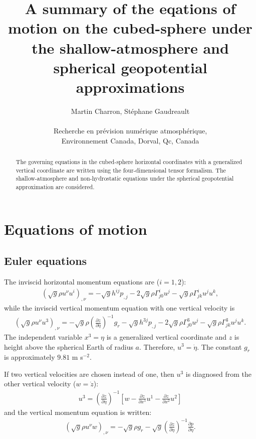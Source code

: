 \documentclass{article}
\begin{document}
\title{A summary of the eqations of motion on the cubed-sphere under the shallow-atmosphere and spherical geopotential approximations}

\author{Martin Charron, St\'ephane Gaudreault \\
\\ \vspace{6pt} Recherche en pr\'evision num\'erique atmosph\'erique, 
\\ Environnement Canada, Dorval, Qc, Canada}

\maketitle

\begin{abstract}
The governing equations in the cubed-sphere horizontal coordinates with a generalized vertical coordinate are written using the four-dimensional tensor formalism. The shallow-atmosphere and non-hydrostatic equations under the spherical geopotential approximation are considered.
\end{abstract}

\section{Equations of motion}
\subsection{Euler equations}
The inviscid horizontal momentum equations are ($i=1,2$):
\begin{align}
\left( \sqrt{g}\rho u^\nu u^i\right)_{,\nu} = - \sqrt{g}h^{ij}p_{,j} -2\sqrt{g} \rho \Gamma^i_{j0} u^j - \sqrt{g} \rho \Gamma^i_{jk}u^ju^k,
\end{align}
while the inviscid vertical momentum equation with one vertical velocity is
\begin{align}
\left( \sqrt{g}\rho u^\nu u^3\right)_{,\nu} = - \sqrt{g} \rho \left(\frac{\partial z}{\partial \eta}\right)^{-1} g_r - \sqrt{g}h^{3j}p_{,j} -2\sqrt{g} \rho \Gamma^3_{j0} u^j - \sqrt{g} \rho \Gamma^3_{jk}u^ju^k.
\end{align}
The independent variable $x^3=\eta$ is a generalized vertical coordinate and $z$ is height above the spherical Earth of radius $a$. Therefore, $u^3=\dot\eta$. The constant $g_r$ is approximately $9.81$ m s$^{-2}$.

If two vertical velocities are chosen instead of one, then $u^3$ is diagnosed from the other vertical velocity ($w=\dot z$):
\begin{align}
u^3=\left(\frac{\partial z}{\partial \eta}\right)^{-1}\left[ w - \frac{\partial z}{\partial x^1} u^1 - \frac{\partial z}{\partial x^2} u^2 \right]
\end{align}
and the vertical momentum equation is written:
\begin{align}
\left(\sqrt{g}\rho u^\nu w\right)_{,\nu}=-\sqrt{g}\rho g_r-\sqrt{g} \left(\frac{\partial z}{\partial \eta}\right)^{-1} \frac{\partial p}{\partial\eta}.
\end{align}
\end{document}
